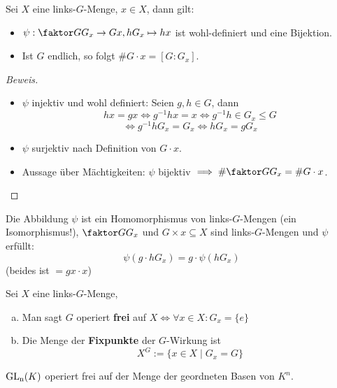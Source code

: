 \documentclass[a4paper]{report}
\begin{document}
\begin{prop}[Bahngleichung]
  Sei $X$ eine links-$G$-Menge, $x \in X$, dann gilt:
  \begin{itemize}
    \item $\psi : \fak{G}{G_{x}} \to Gx, hG_{x} \mapsto hx$ ist wohl-definiert und eine Bijektion.
    \item Ist $G$ endlich, so folgt $\# G\cdot x = [G : G_{x}]$.
  \end{itemize}
\end{prop}
\begin{proof}[Beweis] \item
  \begin{itemize}
    \item $\psi$ injektiv und wohl definiert: Seien $g, h \in G$, dann
          \[hx = gx \iff g^{-1}hx = x \iff g^{-1}h \in G_{x} \le G\]
          \[\iff g^{-1}h G_{x} = G_{x} \iff hG_{x} = gG_x\]
    \item $\psi$ surjektiv nach Definition von $G\cdot x$.
    \item Aussage über Mächtigkeiten: $\psi$ bijektiv $\imp \# \fak G{G_{x}} = \#G \cdot x$.
  \end{itemize}
\end{proof}

\begin{bem*} Die Abbildung $\psi$ ist ein Homomorphismus von links-$G$-Mengen (ein Isomorphismus!), $\fak G{G_{x}}$ und $G \times x \subseteq X$ sind links-$G$-Mengen und $\psi$ erfüllt:
  \[\psi (g \cdot h G_{x}) = g\cdot  \psi (hG_{x})\]
  (beides ist $=gx \cdot x$)
\end{bem*}


\begin{defi}%
  Sei $X$ eine links-$G$-Menge,
  \begin{enumerate}[(a)]
    \item Man sagt $G$ operiert \textbf{frei} auf $X \iff \forall x \in X : G_{x} = \{e\}$
    \item Die Menge der \textbf{Fixpunkte} der $G$-Wirkung ist \[X^{G} := \{x \in X \mid G_{x} = G\}\]
  \end{enumerate}
\end{defi}

\begin{bsp*}
$\operatorname{GL_n}(K)$ operiert frei auf der Menge der geordneten Basen von $K^{n}$.
\end{bsp*}
\end{document}
